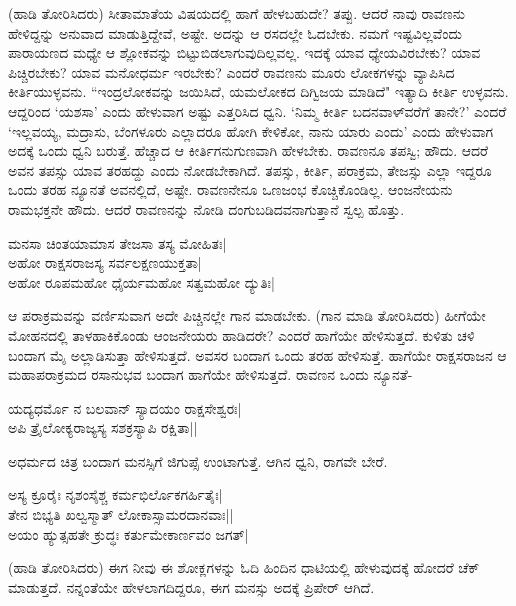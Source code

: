 (ಹಾಡಿ ತೋರಿಸಿದರು) ಸೀತಾಮಾತೆಯ ವಿಷಯದಲ್ಲಿ ಹಾಗೆ ಹೇಳಬಹುದೇ? ತಪ್ಪು. ಆದರೆ ನಾವು ರಾವಣನು ಹೇಳಿದ್ದನ್ನು ಅನುವಾದ ಮಾಡುತ್ತಿದ್ದೇವೆ, ಅಷ್ಟೇ. ಅದನ್ನು ಆ ರಸದಲ್ಲೇ ಓದಬೇಕು. ನಮಗೆ ಇಷ್ಟವಿಲ್ಲವೆಂದು ಪಾರಾಯಣದ ಮಧ್ಯೇ ಆ ಶ್ಲೋಕವನ್ನು ಬಿಟ್ಟುಬಿಡಲಾಗುವುದಿಲ್ಲವಲ್ಲ. ಇದಕ್ಕೆ ಯಾವ ಧ್ಯೇಯವಿರಬೇಕು? ಯಾವ ಪಿಚ್ಚಿರಬೇಕು? ಯಾವ ಮನೋಧರ್ಮ ಇರಬೇಕು? ಎಂದರೆ ರಾವಣನು ಮೂರು ಲೋಕಗಳನ್ನು ವ್ಯಾಪಿಸಿದ ಕೀರ್ತಿಯುಳ್ಳವನು. ``ಇಂದ್ರಲೋಕವನ್ನು ಜಯಿಸಿದೆ, ಯಮಲೋಕದ ದಿಗ್ವಿಜಯ ಮಾಡಿದೆ" ಇತ್ಯಾದಿ ಕೀರ್ತಿ ಉಳ್ಳವನು. ಆದ್ದರಿಂದ `ಯಶಸಾ' ಎಂದು ಹೇಳುವಾಗ ಅಷ್ಟು ಎತ್ತರಿಸಿದ ಧ್ವನಿ. `ನಿಮ್ಮ ಕೀರ್ತಿ ಬದನವಾಳ್‍ವರೆಗೆ ತಾನೇ?' ಎಂದರೆ `ಇಲ್ಲವಯ್ಯ, ಮದ್ರಾಸು, ಬೆಂಗಳೂರು ಎಲ್ಲಾದರೂ ಹೋಗಿ ಕೇಳಿಕೋ, ನಾನು ಯಾರು ಎಂದು' ಎಂದು ಹೇಳುವಾಗ ಅದಕ್ಕೆ ಒಂದು ಧ್ವನಿ ಬರುತ್ತೆ. ಹೆಚ್ಚಾದ ಆ ಕೀರ್ತಿಗನುಗುಣವಾಗಿ ಹೇಳಬೇಕು. ರಾವಣನೂ ತಪಸ್ವಿ; ಹೌದು. ಆದರೆ ಅವನ ತಪಸ್ಸು ಯಾವ ತರಹದ್ದು ಎಂದು ನೋಡಬೇಕಾಗಿದೆ. ತಪಸ್ಸು, ಕೀರ್ತಿ, ಪರಾಕ್ರಮ, ತೇಜಸ್ಸು ಎಲ್ಲಾ ಇದ್ದರೂ ಒಂದು ತರಹ ನ್ಯೂನತೆ ಅವನಲ್ಲಿದೆ, ಅಷ್ಟೇ. ರಾವಣನೇನೂ ಒಣಜಂಭ ಕೊಚ್ಚಿಕೊಂಡಿಲ್ಲ. ಆಂಜನೇಯನು ರಾಮಭಕ್ತನೇ ಹೌದು. ಆದರೆ ರಾವಣನನ್ನು ನೋಡಿ ದಂಗುಬಡಿದವನಾಗುತ್ತಾನೆ ಸ್ವಲ್ಪ ಹೊತ್ತು. 

\begin{shloka} 
ಮನಸಾ ಚಿಂತಯಾಮಾಸ ತೇಜಸಾ ತಸ್ಯ ಮೋಹಿತಃ|\\ 
ಅಹೋ ರಾಕ್ಷಸರಾಜಸ್ಯ ಸರ್ವಲಕ್ಷಣಯುಕ್ತತಾ|\\ 
ಅಹೋ ರೂಪಮಹೋ ಧೈರ್ಯಮಹೋ ಸತ್ವಮಹೋ ದ್ಯುತಿಃ|
\end{shloka}

ಆ ಪರಾಕ್ರಮವನ್ನು ವರ್ಣಿಸುವಾಗ ಅದೇ ಪಿಚ್ಚಿನಲ್ಲೇ ಗಾನ ಮಾಡಬೇಕು. (ಗಾನ ಮಾಡಿ ತೋರಿಸಿದರು) ಹೀಗೆಯೇ ಮೋಹನದಲ್ಲಿ ತಾಳಹಾಕಿಕೊಂಡು ಆಂಜನೇಯರು ಹಾಡಿದರೇ? ಎಂದರೆ ಹಾಗೆಯೇ ಹೇಳಿಸುತ್ತದೆ. ಕುಳಿತು ಚಳಿ ಬಂದಾಗ ಮೈ ಅಲ್ಲಾಡಿಸುತ್ತಾ ಹೇಳಿಸುತ್ತದೆ. ಅವಸರ ಬಂದಾಗ ಒಂದು ತರಹ ಹೇಳಿಸುತ್ತೆ. ಹಾಗೆಯೇ ರಾಕ್ಷಸರಾಜನ ಆ ಮಹಾಪರಾಕ್ರಮದ ರಸಾನುಭವ ಬಂದಾಗ ಹಾಗೆಯೇ ಹೇಳಿಸುತ್ತದೆ. ರಾವಣನ ಒಂದು ನ್ಯೂನತೆ- 

\begin{shloka} 
ಯದ್ಯಧರ್ಮೊ ನ ಬಲವಾನ್‍ ಸ್ಯಾದಯಂ ರಾಕ್ಷಸೇಶ್ವರಃ|\\ 
ಅಪಿ ತ್ರೈಲೋಕ್ಯರಾಜ್ಯಸ್ಯ ಸಶಕ್ರಸ್ಯಾಪಿ ರಕ್ಷಿತಾ||
\end{shloka}

ಅಧರ್ಮದ ಚಿತ್ರ ಬಂದಾಗ ಮನಸ್ಸಿಗೆ ಜಿಗುಪ್ಸೆ ಉಂಟಾಗುತ್ತೆ. ಆಗಿನ ಧ್ವನಿ, ರಾಗವೇ ಬೇರೆ. 

\begin{shloka}
ಅಸ್ಯ ಕ್ರೂರೈಃ ನೃಶಂಸೈಶ್ಚ\label{192} ಕರ್ಮಭಿರ್ಲೊಕಗರ್ಹಿತೈಃ|\\ 
ತೇನ ಬಿಭ್ಯತಿ ಖಲ್ವಸ್ಮಾತ್‍ ಲೋಕಾಸ್ಸಾಮರದಾನವಾಃ||\\ 
ಅಯಂ ಹ್ಯುತ್ಸಹತೇ ಕ್ರುದ್ಧಃ ಕರ್ತುಮೇಕಾರ್ಣವಂ ಜಗತ್‍|
\end{shloka}


(ಹಾಡಿ ತೋರಿಸಿದರು) ಈಗ ನೀವು ಈ ಶೋಕ್ಲಗಳನ್ನು ಓದಿ ಹಿಂದಿನ ಧಾಟಿಯಲ್ಲಿ ಹೇಳುವುದಕ್ಕೆ ಹೋದರೆ ಚೆಕ್‍ ಮಾಡುತ್ತದೆ. ನನ್ನಂತೆಯೇ ಹೇಳಲಾಗದಿದ್ದರೂ, ಈಗ ಮನಸ್ಸು ಅದಕ್ಕೆ ಪ್ರಿಪೇರ್‍ ಆಗಿದೆ. 

